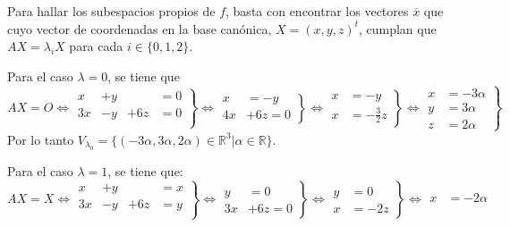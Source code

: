 \begin{solucion}
 \par 
 Para hallar los subespacios propios de $f$, basta con encontrar los vectores $\overline{x}$ que cuyo vector de coordenadas en la base can\'onica, $X = (x, y, z)^t$, cumplan que $AX = \lambda_iX$ para cada $i \in \{ 0, 1, 2\}$.
 \par 
 Para el caso $\lambda = 0$, se tiene que
 \begin{equation*}
  AX = O \Leftrightarrow 
  \left.
  \begin{matrix}
    x & +y &     & = 0 \\
   3x & -y & +6z & = 0 \\
  \end{matrix}
  \right\} \Leftrightarrow
  \left.
  \begin{matrix}
   x  & = -y \\
   4x & +6z = 0
  \end{matrix}
  \right\} \Leftrightarrow
  \left.
  \begin{matrix}
   x  & = -y \\
   x & = -\frac{3}{2}z
  \end{matrix}
  \right\} \Leftrightarrow
  \left.
  \begin{matrix}
   x & = -3\alpha \\
   y & =  3\alpha \\
   z & =  2\alpha
  \end{matrix}
  \right\}
 \end{equation*}
 Por lo tanto $V_{\lambda_0} = \{ (-3\alpha, 3\alpha, 2\alpha) \in \mathbb{R}^3| \alpha \in \mathbb{R} \}$. \par 
 Para el caso $\lambda = 1$, se tiene que:
 \begin{equation*}
  AX = X \Leftrightarrow 
  \left.
  \begin{matrix}
    x & +y &     & = x \\
   3x & -y & +6z & = y \\
  \end{matrix}
  \right\} \Leftrightarrow
  \left.
  \begin{matrix}
   y  & = 0 \\
   3x & +6z = 0
  \end{matrix}
  \right\} \Leftrightarrow
  \left.
  \begin{matrix}
   y & = 0 \\
   x & = -2z
  \end{matrix}
  \right\} \Leftrightarrow
  \left.
  \begin{matrix}
   x & = -2\alpha \\

\end{matrix}
\end{equation*}
\end{solucion}
